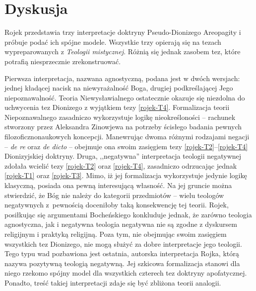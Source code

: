 \section{Dyskusja}\label{roj-dyskusja}

Rojek przedstawia trzy interpretacje doktryny Pseudo-Dionizego Areopagity i próbuje podać
ich spójne modele. Wszystkie trzy opierają się na tezach
wypreparowanych z \textit{Teologii mistycznej}. Różnią się jednak zasobem tez, które potrafią niesprzecznie
zrekonstruować.

Pierwsza interpretacja, nazwana agnostyczną, podana jest w dwóch
wersjach: jednej kładącej nacisk na niewyrażalność Boga, drugiej
podkreślającej Jego niepoznawalność. Teoria Niewysławialnego ostatecznie okazuje
się niezdolna do uchwycenia tez Dionizego z wyjątkiem tezy \eqref{rojek-T4}.
Formalizacja teorii Niepoznawalnego zasadniczo wykorzystuje logikę
nieokreśloności -- rachunek stworzony przez Aleksandra Zinowjewa na
potrzeby ścisłego badania pewnych filozoficznonaukowych koncepcji.
Manewrując dwoma różnymi rodzajami negacji -- \textit{de re} oraz
\textit{de dicto} -- obejmuje ona swoim zasięgiem 
tezy \eqref{rojek-T2}--\eqref{rojek-T4} Dionizyjskiej doktryny.
%
Druga, ,,negatywna'' interpretacja teologii negatywnej zdołała wcielić
tezy \eqref{rojek-T2} oraz \eqref{rojek-T4}, zasadniczo odrzucając jednak \eqref{rojek-T1} oraz \eqref{rojek-T3}. Mimo,
iż jej formalizacja wykorzystuje jedynie logikę klasyczną, posiada ona
pewną interesującą własność. Na jej gruncie można stwierdzić, że Bóg
nie należy do kategorii przedmiotów -- wielu teologów negatywnych z~pewnością doceniłoby taką konsekwencję tej teorii.  Rojek, posiłkując się argumentami Bocheńskiego konkluduje jednak, że zarówno
teologia agnostyczna, jak i negatywna teologia negatywna nie są zgodne z
dyskursem religijnym i praktyką religijną. Poza tym, nie obejmując
swoim zasięgiem wszystkich tez Dionizego, nie mogą służyć za dobre
interpretacje jego teologii.
%
Tego typu wad pozbawiona jest ostatnia, autorska
interpretacja Rojka, którą nazywa pozytywną teologią negatywną. Jej szkicowa
formalizacja stanowi dla niego rzekomo spójny model dla wszystkich czterech tez doktryny
apofatycznej. Ponadto, treść takiej interpretacji zdaje się być zbliżona teorii analogii.

